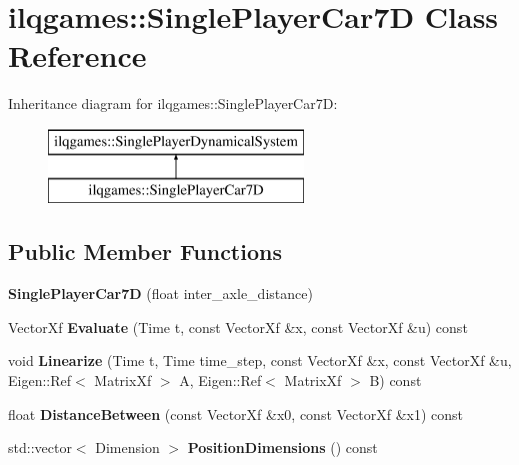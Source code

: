 \hypertarget{classilqgames_1_1_single_player_car7_d}{}\section{ilqgames\+:\+:Single\+Player\+Car7D Class Reference}
\label{classilqgames_1_1_single_player_car7_d}
Inheritance diagram for ilqgames\+:\+:Single\+Player\+Car7D\+:\begin{figure}[H]
\begin{center}
\leavevmode
\includegraphics[height=2.000000cm]{classilqgames_1_1_single_player_car7_d}
\end{center}
\end{figure}
\subsection*{Public Member Functions}
\begin{DoxyCompactItemize}
\item 
{\bfseries Single\+Player\+Car7D} (float inter\+\_\+axle\+\_\+distance)\hypertarget{classilqgames_1_1_single_player_car7_d_a31ca08f1230c5c180d8b1f55230f4c49}{}\label{classilqgames_1_1_single_player_car7_d_a31ca08f1230c5c180d8b1f55230f4c49}

\item 
Vector\+Xf {\bfseries Evaluate} (Time t, const Vector\+Xf \&x, const Vector\+Xf \&u) const \hypertarget{classilqgames_1_1_single_player_car7_d_a84d452cb5dd31f143d75def83a14f4c3}{}\label{classilqgames_1_1_single_player_car7_d_a84d452cb5dd31f143d75def83a14f4c3}

\item 
void {\bfseries Linearize} (Time t, Time time\+\_\+step, const Vector\+Xf \&x, const Vector\+Xf \&u, Eigen\+::\+Ref$<$ Matrix\+Xf $>$ A, Eigen\+::\+Ref$<$ Matrix\+Xf $>$ B) const \hypertarget{classilqgames_1_1_single_player_car7_d_a206924124fe73eefa173f4e9c52a1c6d}{}\label{classilqgames_1_1_single_player_car7_d_a206924124fe73eefa173f4e9c52a1c6d}

\item 
float {\bfseries Distance\+Between} (const Vector\+Xf \&x0, const Vector\+Xf \&x1) const \hypertarget{classilqgames_1_1_single_player_car7_d_a409dce5e2bb27fabd19057fb5084187f}{}\label{classilqgames_1_1_single_player_car7_d_a409dce5e2bb27fabd19057fb5084187f}

\item 
std\+::vector$<$ Dimension $>$ {\bfseries Position\+Dimensions} () const \hypertarget{classilqgames_1_1_single_player_car7_d_a7fec02f8549442d4de84f89009de7c61}{}\label{classilqgames_1_1_single_player_car7_d_a7fec02f8549442d4de84f89009de7c61}

\end{DoxyCompactItemize}
